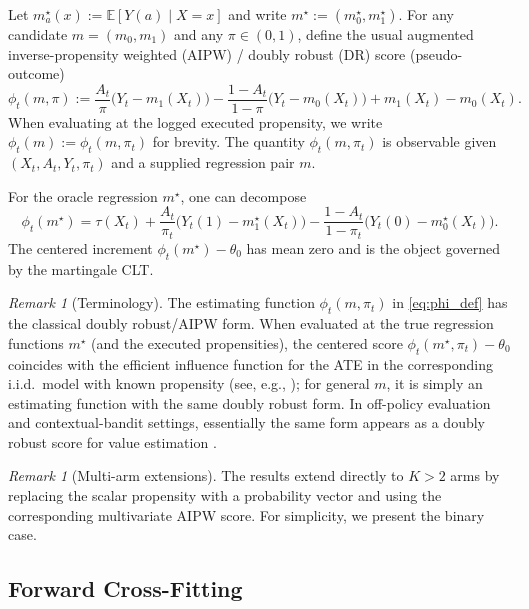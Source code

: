 \documentclass[11pt]{article}
\numberwithin{equation}{section}
\theoremstyle{plain}
\theoremstyle{definition}
\theoremstyle{remark}
\newtheorem{remark}[theorem]{Remark}
\newcommand{\E}{\mathbb{E}}
\begin{document}
Let $m_a^\star(x):=\E[Y(a)\mid X=x]$ and write $m^\star:=(m_0^\star,m_1^\star)$. For any candidate $m=(m_0,m_1)$ and any $\pi\in(0,1)$, define the usual augmented inverse-propensity weighted (AIPW) / doubly robust (DR) score \citep{robinsRotnitzkyZhao1994,bangRobins2005} (pseudo-outcome)
\begin{equation}\label{eq:phi_def}
\phi_t(m,\pi)
:=
\frac{A_t}{\pi}\big(Y_t-m_1(X_t)\big)
-\frac{1-A_t}{1-\pi}\big(Y_t-m_0(X_t)\big)
+m_1(X_t)-m_0(X_t).
\end{equation}
When evaluating at the logged executed propensity, we write $\phi_t(m):=\phi_t(m,\pi_t)$ for brevity. The quantity $\phi_t(m,\pi_t)$ is observable given $(X_t,A_t,Y_t,\pi_t)$ and a supplied regression pair $m$.

For the oracle regression $m^\star$, one can decompose
\begin{equation}\label{eq:phi_oracle}
\phi_t(m^\star)
=
\tau(X_t)
+\frac{A_t}{\pi_t}\big(Y_t(1)-m_1^\star(X_t)\big)
-\frac{1-A_t}{1-\pi_t}\big(Y_t(0)-m_0^\star(X_t)\big).
\end{equation}
The centered increment $\phi_t(m^\star)-\theta_0$ has mean zero and is the object governed by the martingale CLT.

\begin{remark}[Terminology]\label{rem:dr_terminology}
The estimating function $\phi_t(m,\pi_t)$ in \eqref{eq:phi_def} has the classical doubly robust/AIPW form. When evaluated at the true regression functions $m^\star$ (and the executed propensities), the centered score $\phi_t(m^\star,\pi_t)-\theta_0$ coincides with the efficient influence function for the ATE in the corresponding i.i.d.\ model with known propensity (see, e.g., \citep{hahn1998role,tsiatis2006semiparametric}); for general $m$, it is simply an estimating function with the same doubly robust form. In off-policy evaluation and contextual-bandit settings, essentially the same form appears as a doubly robust score for value estimation \citep{dudikLangfordLi2011,dudikErhanLangfordLi2014}.
\end{remark}

\begin{remark}[Multi-arm extensions]\label{rem:multiarm}
The results extend directly to $K>2$ arms by replacing the scalar propensity with a probability vector and using the corresponding multivariate AIPW score. For simplicity, we present the binary case.
\end{remark}

\subsection{Forward Cross-Fitting}\label{sec:fcf}
\end{document}
